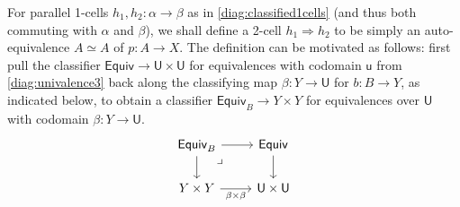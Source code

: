 \documentclass[12pt,reqno]{amsart}
\newcommand{\ednote}[1]{[\textit{\color{red}{#1}}]} %
\renewcommand{\to}{\ensuremath{\rightarrow}}
\renewcommand{\t}{\ensuremath{\mathsf{u}}}
\newcommand{\T}{\ensuremath{\mathsf{U}}}
\newcommand{\pbcorner}{\arrow[dr,phantom,"\lrcorner" very near start, shift right=.5ex]} %
\theoremstyle{remark}
\theoremstyle{definition}
\begin{document}
%
%
For parallel 1-cells $h_1, h_2 : \alpha \to \beta$ as in \eqref{diag:classified1cells} (and thus both commuting with $\alpha$ and $\beta$), we shall define a 2-cell $h_1\Rightarrow h_2$ to be simply an auto-equivalence $A\simeq A$ of $p :A \to X$.
The definition can be motivated as follows: first pull the classifier $\mathsf{Equiv} \to \T\times\T$ for equivalences with codomain $\t$ from \eqref{diag:univalence3} back along the classifying map $\beta : Y\to \T$ for $b:B \to Y$, as indicated below, to obtain a classifier $\mathsf{Equiv}_B \to Y\times Y$ for equivalences over $\T$ with codomain $\beta : Y \to \T$.
\begin{equation}\label{eq:pulledbackclassifier}
\begin{tikzcd}
	\mathsf{Equiv}_B \ar[d] \ar[r]  \pbcorner & \mathsf{Equiv} \ar[d] \\  
	Y\times Y \ar[r,swap,"{\beta \times \beta}"] &  \T \times \T
 \end{tikzcd}
 \end{equation}
 
\end{document}
